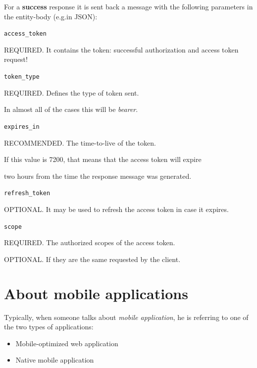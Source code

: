 For a \textbf{success} response it is sent back a message with the following parameters in the entity-body (e.g.in JSON):

\texttt{access\_token}

\hspace{0.5cm}REQUIRED. It contains the token: successful authorization and access token request! 

\texttt{token\_type}

\hspace{0.5cm}REQUIRED. Defines the type of token sent.

\hspace{0.5cm}In almost all of the cases this will be \textit{bearer}.

\texttt{expires\_in}

\hspace{0.5cm}RECOMMENDED. The time-to-live of the token.

\hspace{0.5cm}If this value is 7200, that means that the access token will expire

\hspace{0.5cm}two hours from the time the response message was generated.

\vspace{0.5cm}

\texttt{refresh\_token}

\hspace{0.5cm}OPTIONAL. It may be used to refresh the access token in case it expires.

\texttt{scope}

\hspace{0.5cm}REQUIRED. The authorized scopes of the access token.

\hspace{0.5cm}OPTIONAL. If they are the same requested by the client.


\section{About mobile applications}
Typically, when someone talks about \textit{mobile application}, he is referring to one of the two types of applications:

\begin{itemize}
    \item Mobile-optimized web application
    \item Native mobile application
\end{itemize}

